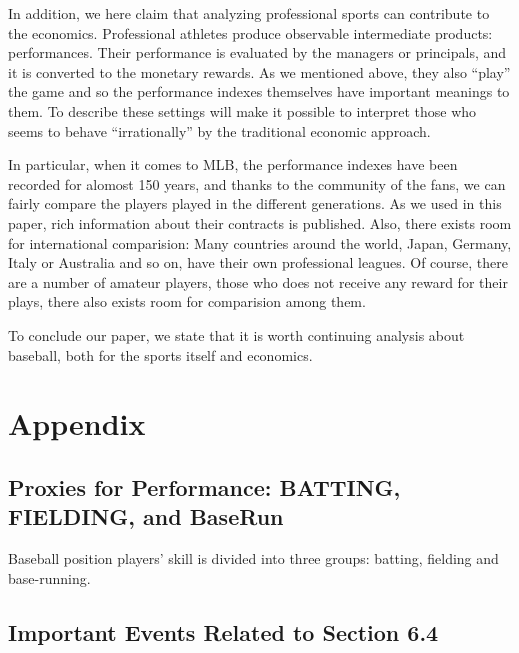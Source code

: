 \documentclass[dvipdfmx, 12pt]{article}
\begin{document}
In addition, we here claim that analyzing professional sports can contribute to the economics. Professional athletes produce observable intermediate products: performances. Their performance is evaluated by the managers or principals, and it is converted to the monetary rewards. As we mentioned above, they also ``play'' the game and so the performance indexes themselves have important meanings to them. To describe these settings will make it possible to interpret those who seems to behave ``irrationally'' by the traditional economic approach.

In particular, when it comes to MLB, the performance indexes have been recorded for alomost 150 years, and thanks to the community of the fans, we can fairly compare the players played in the different generations. As we used in this paper, rich information about their contracts is published. Also, there exists room for international comparision: Many countries around the world, Japan, Germany, Italy or Australia and so on, have their own professional leagues. Of course, there are a number of amateur players, those who does not receive any reward for their plays, there also exists room for comparision among them.

To conclude our paper, we state that it is worth continuing analysis about baseball, both for the sports itself and economics.


\section{Appendix}

\subsection{Proxies for Performance: BATTING, FIELDING, and BaseRun}
\small

Baseball position players' skill is divided into three groups: batting, fielding and base-running.



\subsection{Important Events Related to Section 6.4}
\end{document}
